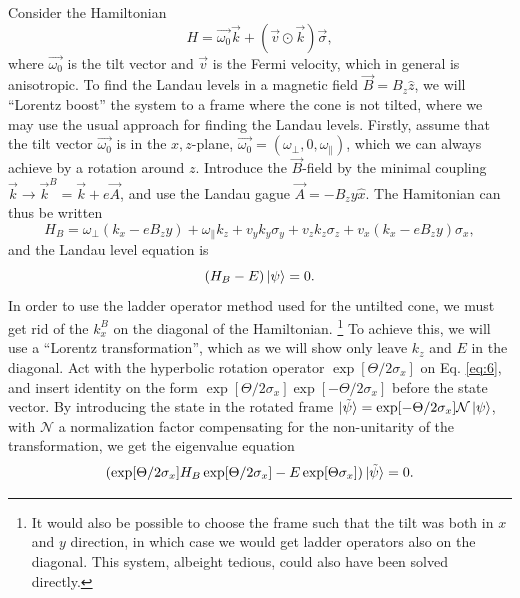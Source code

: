 Consider the Hamiltonian
\begin{equation}
  \label{eq:4}
  H = \vec{\omega_{0}} \vec{k} + (\vec{v} \odot \vec{k}) \vec{\sigma},
\end{equation}
where \(\vec{\omega_{0}}\) is the tilt vector and \(\vec{v}\) is the Fermi velocity, which in general is anisotropic.
To find the Landau levels in a magnetic field \(\vec{B} = B_{z}\hat{z} \), we will ``Lorentz boost'' the system to a frame where the cone is not tilted, where we may use the usual approach for finding the Landau levels.
Firstly, assume that the tilt vector \(\vec{\omega_{0}}\) is in the \(x,z\)-plane, \(\vec{\omega_{0}} = (\omega_{\perp}, 0, \omega_{\parallel})\), which we can always achieve by a rotation around \(z\).
Introduce the \(\vec{B}\)-field by the minimal coupling \(\vec{k} \to \vec{k}^B = \vec{k} + e \vec{A}\), and use the Landau gague \(\vec{A} = -B_{z}y \hat{x}\).
The Hamitonian can thus be written
\begin{equation}
  \label{eq:5}
  H_{B} = \omega _{\perp} \left(k_{x} - e B_{z} y \right) + \omega _{\parallel} k_{z} + v_{y} k_{y} \sigma _{y} + v_{z} k_{z} \sigma _{z} + v_{x} \left(k_{x} - e B_{z} y\right) \sigma _{x},
\end{equation}
and the Landau level equation is
\begin{equation}
  \label{eq:6}
  \left(H_{B} - E\right) \ket{\psi } = 0.
\end{equation}
In order to use the ladder operator method used for the untilted cone, we must get rid of the \(k^B_{x}\) on the diagonal of the Hamiltonian.
\footnote{It would also be possible to choose the frame such that the tilt was both in \(x\) and \(y\) direction, in which case we would get ladder operators also on the diagonal.
  This system, albeight tedious, could also have been solved directly.
}
To achieve this, we will use a ``Lorentz transformation'', which as we will show only leave \(k_{z}\) and \(E\) in the diagonal.
Act with the hyperbolic rotation operator \(\exp[\Theta /2 \sigma_{x}]\) on Eq. \eqref{eq:6}, and insert identity on the form \(\exp[\Theta /2 \sigma_{x}]\exp[-\Theta /2 \sigma_{x}]\) before the state vector.
By introducing the state in the rotated frame \(\ket{\tilde{\psi}} = \exp[- \Theta /2 \sigma_{x}] \mathcal{N} \ket{\psi } \), with \(\mathcal{N}\) a normalization factor compensating for the non-unitarity of the transformation, we get the eigenvalue equation
\begin{equation}
  \label{eq:7}
  (\exp[\Theta /2 \sigma_{x}] H_{B}\exp[\Theta /2 \sigma_{x}] - E \exp[\Theta \sigma_{x}]) \ket{\tilde{\psi}} = 0.
\end{equation}

